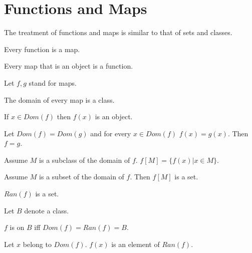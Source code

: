 \documentclass[11pt]{article}
\begin{document}
\section{Functions and Maps}
The treatment of functions and maps is similar to that
of sets and classes.
\begin{forthel}

\begin{lemma} Every function is a map.
\end{lemma}

\begin{lemma} Every map that is an object is a function.
\end{lemma}

Let $f,g$ stand for maps.

\begin{lemma} The domain of every map is a class.
\end{lemma}

\begin{lemma} If $x \in Dom(f)$ then $f(x)$ is an object.
\end{lemma}

\begin{lemma}  Let $Dom(f)=Dom(g)$ and for every $x \in Dom(f)$
$f(x)=g(x)$. Then $f=g$.
\end{lemma}


\begin{definition}
Assume $M$ is a subclass of the domain of $f$.
$f[M] = \{ f(x) | x \in M \}$.
\end{definition}

\begin{axiom} 
Assume $M$ is a subset of the domain of $f$.
Then $f[M]$ is a set.
\end{axiom}

\begin{signature} [RanSort]  $Ran(f)$ is a set.
\end{signature}

Let $B$ denote a class.

\begin{definition} [DefDom]  $f$ is on $B$ iff
$Dom(f) = Ran(f) = B$.
\end{definition}

\begin{axiom} [ImgSort]  Let $x$ belong to $Dom(f)$.
    $f(x)$ is an element of $Ran(f)$.
\end{axiom}

\end{forthel}
\end{document}
